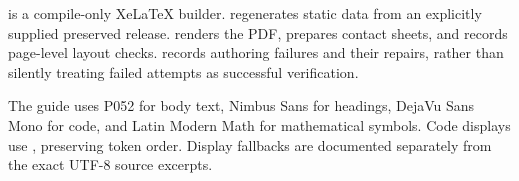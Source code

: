  is a compile-only XeLaTeX builder.  regenerates static data from an explicitly supplied preserved release.  renders the PDF, prepares contact sheets, and records page-level layout checks.  records authoring failures and their repairs, rather than silently treating failed attempts as successful verification.

The guide uses P052 for body text, Nimbus Sans for headings, DejaVu Sans Mono for code, and Latin Modern Math for mathematical symbols. Code displays use , preserving token order. Display fallbacks are documented separately from the exact UTF-8 source excerpts.

